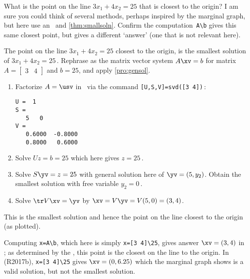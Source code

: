 \begin{reduce}
\begin{example} 
What is the point on the line \(3x_1+4x_2=25\) that is closest to the origin?
I am sure you could think of several methods, perhaps inspired by the marginal graph, but here use an \svd\ and \autoref{thm:smallsoln}.
Confirm the \script[2] computation~\verb|A\b| gives this same closest point, but \script[1] gives a different `answer' (one that is not relevant here).
\begin{solution} 
The point on the line \(3x_1+4x_2=25\) closest to the origin, is the smallest solution of \(3x_1+4x_2=25\)\,.  
Rephrase as the matrix vector system \(A\xv=b\) for matrix \(A=\begin{bmatrix} 3&4 \end{bmatrix}\) and \(b=25\), and apply \autoref{pro:gensol}.
\begin{enumerate}
\item Factorize \(A=\usv\) in \script\ via the command \verb|[U,S,V]=svd([3 4])|\,:
\begin{verbatim}
U =  1
S =
   5   0
V =
   0.6000  -0.8000
   0.8000   0.6000
\end{verbatim}
\item Solve \(Uz=b=25\) which here gives \(z=25\)\,.
\item Solve \(S\yv=z=25\) with general solution here of \(\yv=(5,y_2)\). 
Obtain the smallest solution with free variable \(y_2=0\)\,.
\item Solve \(\tr V\xv=\yv\) by \(\xv=V\yv=V(5,0)=(3,4)\).  
\end{enumerate}
This is the smallest solution and hence the point on the line closest to the origin (as plotted).

Computing \verb|x=A\b|, which here is simply \verb|x=[3 4]\25|, gives answer \(\xv=(3,4)\) in \script[2]; as determined by the \svd, this point is the closest on the line to the origin.
In \script[1] (R2017b), \verb|x=[3 4]\25| gives \(\xv=(0,6.25)\) which the marginal graph shows is a valid solution, but not the smallest solution.
\end{solution}
\end{example}
\end{reduce}




